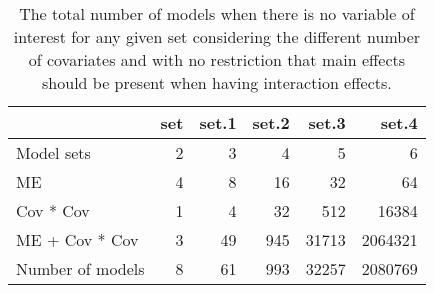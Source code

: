 \begin{table}[!h]
\centering
\caption{The total number of models when there is no variable of interest for any given set considering the different number of covariates and with no restriction that main effects should be present when having interaction effects.} 
\begin{tabular}{lrrrrr}
  \hline
 & set & set.1 & set.2 & set.3 & set.4 \\ 
  \hline
Model sets & 2 & 3 & 4 & 5 & 6 \\ 
  ME & 4 & 8 & 16 & 32 & 64 \\ 
  Cov * Cov & 1 & 4 & 32 & 512 & 16384 \\ 
  ME + Cov * Cov & 3 & 49 & 945 & 31713 & 2064321 \\ 
  Number of models & 8 & 61 & 993 & 32257 & 2080769 \\ 
   \hline
\end{tabular}
\end{table}
